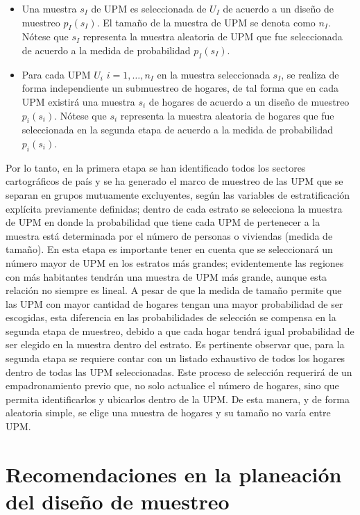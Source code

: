 \documentclass[
  12pt,
  spanish,
]{book}
\providecommand{\tightlist}{%
  \setlength{\itemsep}{0pt}\setlength{\parskip}{0pt}}
\begin{document}
\begin{itemize}
\tightlist
\item
  Una muestra \(s_I\) de UPM es seleccionada de \(U_I\) de acuerdo a un diseño de muestreo \(p_I(s_I)\). El tamaño de la muestra de UPM se denota como \(n_I\). Nótese que \(s_I\) representa la muestra aleatoria de UPM que fue seleccionada de acuerdo a la medida de probabilidad \(p_I(s_I)\).
\item
  Para cada UPM \(U_i\) \(i=1,\dots,n_I\) en la muestra seleccionada \(s_I\), se realiza de forma independiente un submuestreo de hogares, de tal forma que en cada UPM existirá una muestra \(s_i\) de hogares de acuerdo a un diseño de muestreo \(p_i(s_i)\). Nótese que \(s_i\) representa la muestra aleatoria de hogares que fue seleccionada en la segunda etapa de acuerdo a la medida de probabilidad \(p_i(s_i)\).
\end{itemize}

Por lo tanto, en la primera etapa se han identificado todos los sectores cartográficos de país y se ha generado el marco de muestreo de las UPM que se separan en grupos mutuamente excluyentes, según las variables de estratificación explícita previamente definidas; dentro de cada estrato se selecciona la muestra de UPM en donde la probabilidad que tiene cada UPM de pertenecer a la muestra está determinada por el número de personas o viviendas (medida de tamaño). En esta etapa es importante tener en cuenta que se seleccionará un número mayor de UPM en los estratos más grandes; evidentemente las regiones con más habitantes tendrán una muestra de UPM más grande, aunque esta relación no siempre es lineal. A pesar de que la medida de tamaño permite que las UPM con mayor cantidad de hogares tengan una mayor probabilidad de ser escogidas, esta diferencia en las probabilidades de selección se compensa en la segunda etapa de muestreo, debido a que cada hogar tendrá igual probabilidad de ser elegido en la muestra dentro del estrato. Es pertinente observar que, para la segunda etapa se requiere contar con un listado exhaustivo de todos los hogares dentro de todas las UPM seleccionadas. Este proceso de selección requerirá de un empadronamiento previo que, no solo actualice el número de hogares, sino que permita identificarlos y ubicarlos dentro de la UPM. De esta manera, y de forma aleatoria simple, se elige una muestra de hogares y su tamaño no varía entre UPM.

\hypertarget{recomendaciones-en-la-planeaciuxf3n-del-diseuxf1o-de-muestreo}{%
\section{Recomendaciones en la planeación del diseño de muestreo}\label{recomendaciones-en-la-planeaciuxf3n-del-diseuxf1o-de-muestreo}}
\end{document}

